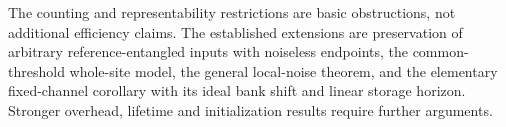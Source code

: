 The counting and representability restrictions are basic obstructions, not additional efficiency claims. The established extensions are preservation of arbitrary reference-entangled inputs with noiseless endpoints, the common-threshold whole-site model, the general local-noise theorem, and the elementary fixed-channel corollary with its ideal bank shift and linear storage horizon. Stronger overhead, lifetime and initialization results require further arguments.
